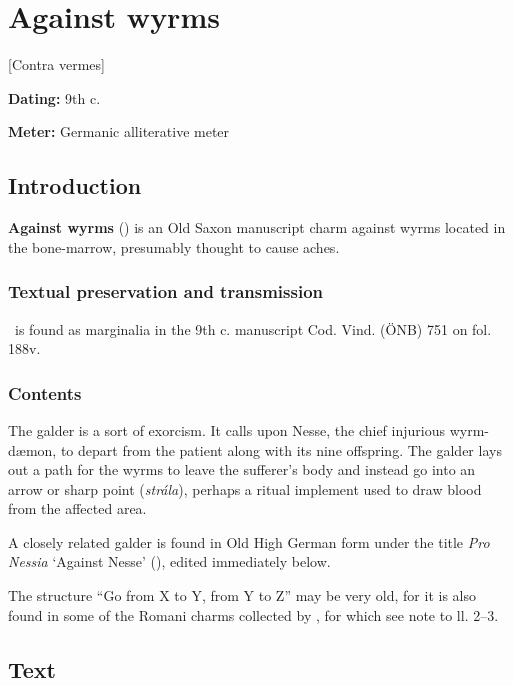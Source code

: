 \section{Against wyrms}[Contra vermes]\chapterStart{}

\begin{flushright}%
\textbf{Dating:} 9th c.

\textbf{Meter:} Germanic alliterative meter
\end{flushright}%

\subsection{Introduction}

\textbf{Against wyrms} (\ContraVermes) is an Old Saxon manuscript charm against wyrms located in the bone-marrow, presumably thought to cause aches.

\subsubsection{Textual preservation and transmission}

\ContraVermes\ is found as marginalia in the 9th c. manuscript Cod. Vind. (ÖNB) 751 on fol. 188v.

\subsubsection{Contents}

The galder is a sort of exorcism.  It calls upon Nesse, the chief injurious wyrm-dæmon, to depart from the patient along with its nine offspring.  The galder lays out a path for the wyrms to leave the sufferer’s body and instead go into an arrow or sharp point (\emph{strála}), perhaps a ritual implement used to draw blood from the affected area.

A closely related galder is found in Old High German form under the title \emph{Pro Nessia} ‘Against Nesse’ (), edited immediately below.

The structure “Go from X to Y, from Y to Z” may be very old, for it is also found in some of the Romani charms collected by \textcite[27,28,95]{Leland1891}, for which see note to ll. 2--3.

\sectionline

\subsection{Text}

